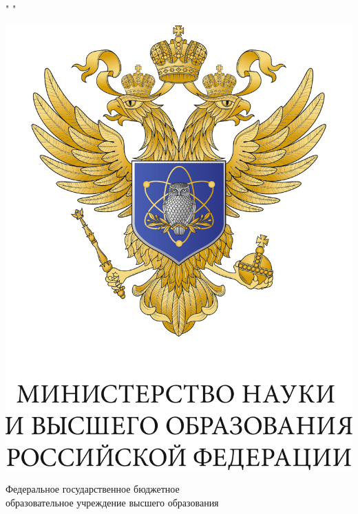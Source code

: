 \documentclass[12pt,a4paper]{article}
\begin{document}
\thispagestyle{empty}
\BgThispage

\begin{center}

" " \vspace{2mm}

\includegraphics[scale=0.5]{pic/eagle}

\begin{large}

\vspace{8mm}


Федеральное государственное бюджетное  \\
образовательное учреждение высшего образования \\
 \\


\end{large}
\end{center}
\end{document}
